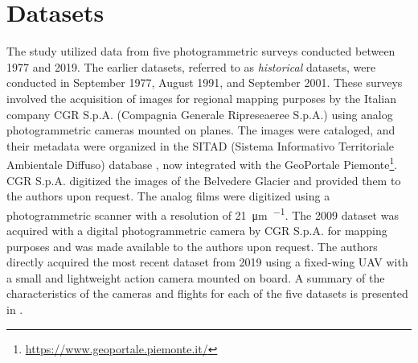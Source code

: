 

\section{Datasets}\label{sec:2:datasets}

The study utilized data from five photogrammetric surveys conducted between 1977 and 2019. The earlier datasets, referred to as \textit{historical} datasets, were conducted in September 1977, August 1991, and September 2001. 
These surveys involved the acquisition of images for regional mapping purposes by the Italian company CGR S.p.A. (Compagnia Generale Ripreseaeree S.p.A.) using analog photogrammetric cameras mounted on planes. 
The images were cataloged, and their metadata were organized in the SITAD (Sistema Informativo Territoriale Ambientale Diffuso) database \citep{Cipriano2005_SITAD}, now integrated with the GeoPortale Piemonte\footnote{\url{https://www.geoportale.piemonte.it/}}.
CGR S.p.A. digitized the images of the Belvedere Glacier and provided them to the authors upon request. 
The analog films were digitized using a photogrammetric scanner with a resolution of \SI{21}{\micro\meter\per\pixel}. 
The 2009 dataset was acquired with a digital photogrammetric camera by CGR S.p.A. for mapping purposes and was made available to the authors upon request.
The authors directly acquired the most recent dataset from 2019 using a fixed-wing UAV with a small and lightweight action camera mounted on board.
A summary of the characteristics of the cameras and flights for each of the five datasets is presented in .

